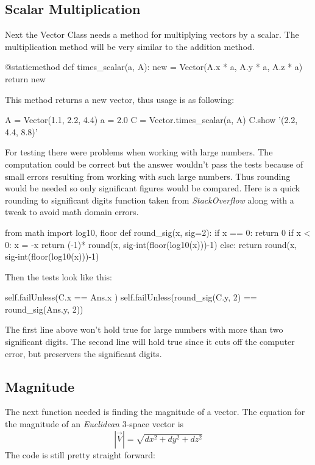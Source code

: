 \documentclass[15pt]{report}
\begin{document}
\subsection{Scalar Multiplication} Next the Vector Class needs a method for multiplying vectors by a scalar. The multiplication method will be very similar to the addition method.

\begin{code}
@staticmethod
def times_scalar(a, A):
    new = Vector(A.x * a, 
                 A.y * a,
                 A.z * a)
    return new
\end{code}

This method returns a new vector, thus usage is as following:

\begin{code}
A = Vector(1.1, 2.2, 4.4)
a = 2.0
C = Vector.times_scalar(a, A)
C.show
'(2.2, 4.4, 8.8)'
\end{code}

For testing there were problems when working with large numbers. The computation could be correct but the answer wouldn't pass the tests because of small errors resulting from working with such large numbers. Thus rounding would be needed so only significant figures would be compared. Here is a quick rounding to significant digits function taken from \textit{StackOverflow}\cite{indgar} along with a tweak to avoid math domain errors.

\begin{code}
from math import log10, floor
def round_sig(x, sig=2):
    if x == 0:
        return 0
    if x < 0:
        x = -x
        return (-1)* round(x, sig-int(floor(log10(x)))-1)
    else:
        return round(x, sig-int(floor(log10(x)))-1)

\end{code}

Then the tests look like this:

\begin{code}
self.failUnless(C.x == Ans.x )            
self.failUnless(round_sig(C.y, 2) == round_sig(Ans.y, 2))
\end{code}

The first line above won't hold true for large numbers with more than two significant digits. The second line will hold true since it cuts off the computer error, but preservers the significant digits.
\subsection{Magnitude} The next function needed is finding the magnitude of a vector. The equation for the magnitude of an \textit{Euclidean} 3-space vector is 
\begin{equation}
\left| \vec{V} \right|  = \sqrt{dx^2 + dy^2 + dz^2}
\end{equation}
The code is still pretty straight forward:
\end{document}
